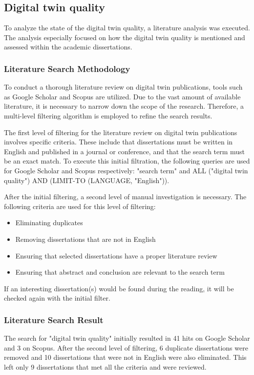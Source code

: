 \documentclass{llncs}
\begin{document}
    \subsection{Digital twin quality}
    To analyze the state of the digital twin quality, a literature analysis was executed. 
    The analysis especially focused on how the digital twin quality is mentioned and assessed within the academic dissertations.

    \subsubsection*{Literature Search Methodology}
    To conduct a thorough literature review on digital twin publications, tools such as Google Scholar and Scopus are utilized. Due to the vast amount of available literature, it is necessary to narrow down the scope of the research. 
    Therefore, a multi-level filtering algorithm is employed to refine the search results.

    The first level of filtering for the literature review on digital twin publications involves specific criteria. These include that dissertations must be written in English and 
    published in a journal or conference, and that the search term must be an exact match. To execute this initial filtration, 
    the following queries are used for Google Scholar and Scopus respectively: "search term" and ALL ("digital twin quality") AND (LIMIT-TO (LANGUAGE, "English")).

    After the initial filtering, a second level of manual investigation is necessary. The following criteria are used for this level of filtering:    
    \begin{itemize}
        \item  Eliminating duplicates
        \item  Removing dissertations that are not in English
        \item  Ensuring that selected dissertations have a proper literature review
        \item  Ensuring that abstract and conclusion are relevant to the search term
    \end{itemize}

    If an interesting dissertation(s) would be found during the reading, it will be checked again with the initial filter.

    \subsubsection*{Literature Search Result}
    The search for "digital twin quality" initially resulted in 41 hits on Google Scholar and 3 on Scopus. 
    After the second level of filtering, 6 duplicate dissertations were removed and 10 dissertations that were not in English were also eliminated. 
    This left only 9 dissertations that met all the criteria and were reviewed.
\end{document}
